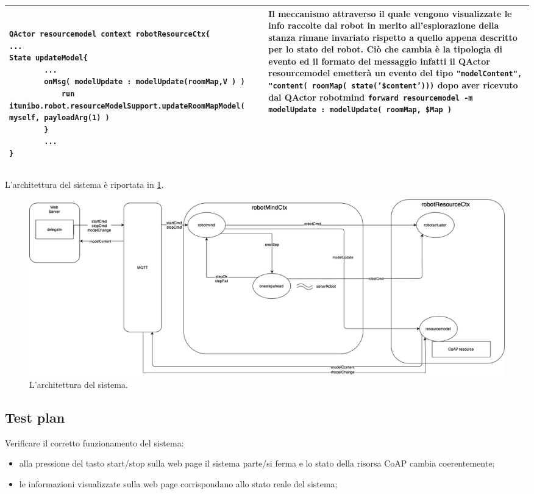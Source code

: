\begin{center}
\begin{longtable}{|p{7cm}|p{7cm}|}
\begin{lstlisting}[backgroundcolor=\color{white} ]

QActor resourcemodel context robotResourceCtx{
...
State updateModel{
        ...
		onMsg( modelUpdate : modelUpdate(roomMap,V ) )
			run itunibo.robot.resourceModelSupport.updateRoomMapModel( myself, payloadArg(1) )
		}
        ...
}

\end{lstlisting}
&

Il meccanismo attraverso il quale vengono visualizzate le info raccolte dal robot in merito all'esplorazione della stanza rimane invariato rispetto a quello appena descritto per lo stato del robot. Ciò che cambia è la tipologia di evento ed il formato del messaggio infatti il QActor resourcemodel emetterà un evento del tipo \texttt{"modelContent", "content( roomMap( state('\$content')))} dopo aver ricevuto dal QActor robotmind \texttt{forward resourcemodel -m modelUpdate  : modelUpdate( roomMap, \$Map )} 
\\\hline

\end{longtable}
\end{center}


L'architettura del sistema è riportata in \cref{fig:arch_logica_3}.


    

\begin{figure}[H]
  \includegraphics[width=\textwidth]{img/sprint3/arch_logica_3.png}
  \caption{L'architettura del sistema.}
  \label{fig:arch_logica_3}
\end{figure}

\subsection{Test plan}

Verificare il corretto funzionamento del sistema:

\begin{itemize}
\item alla pressione del tasto start/stop sulla web page il sistema parte/si ferma e lo stato della risorsa CoAP cambia coerentemente;
\item le informazioni visualizzate sulla web page corrispondano allo stato reale del sistema;
\end{itemize}{}

